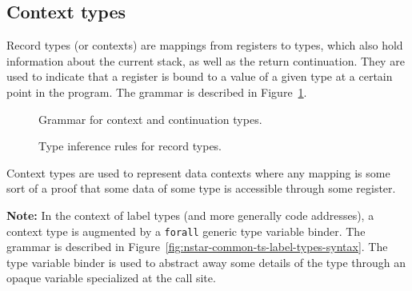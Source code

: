 \subsection{Context types}\label{subsec:nstar-common-ts-records}

Record types (or contexts) are mappings from registers to types, which also hold information about the current stack, as well as the return continuation.
They are used to indicate that a register is bound to a value of a given type at a certain point in the program.
The grammar is described in Figure~\ref{fig:nstar-common-ts-records-syntax}.

\begin{figure}[htb]
  \centering
  \caption{Grammar for context and continuation types.}
  \label{fig:nstar-common-ts-records-syntax}
\end{figure}

\begin{figure}[htb]
  \centering


  \caption{Type inference rules for record types.}
  \label{fig:nstar-common-ts-records-typerules}
\end{figure}

Context types are used to represent data contexts where any mapping is some sort of a proof that some data of some type is accessible through some register.

\vspace{\baselineskip}

\textbf{Note:} In the context of label types (and more generally code addresses), a context type is augmented by a \texttt{forall} generic type variable binder.
The grammar is described in Figure~\ref{fig:nstar-common-ts-label-types-syntax}.
The type variable binder is used to abstract away some details of the type through an opaque variable specialized at the call site.

